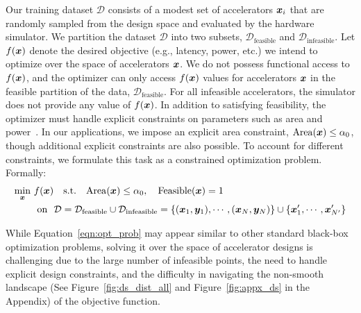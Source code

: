 Our training dataset $\mathcal{D}$ consists of a modest set of accelerators ${\boldsymbol{x}}_i$ that are randomly sampled from the design space and evaluated by the hardware simulator.
%
We partition the dataset $\mathcal{D}$ into two subsets, $\mathcal{D}_\text{feasible}$ and $\mathcal{D}_\text{infeasible}$.
%
Let $f({\boldsymbol{x}})$ denote the desired objective (e.g., latency, power, etc.) we intend to optimize over the space of accelerators ${\boldsymbol{x}}$. We do not possess functional access to $f({\boldsymbol{x}})$, and the optimizer can only access $f({\boldsymbol{x}})$ values for accelerators ${\boldsymbol{x}}$ in the feasible partition of the data, $\mathcal{D}_\text{feasible}$.
%
For all infeasible accelerators, the simulator does not provide any value of $f({\boldsymbol{x}})$.
%
%
In addition to satisfying feasibility, the optimizer must handle explicit constraints on parameters such as area and power~\citep{flynn2011computer}.
%
In our applications, we impose an explicit area constraint, $\mathrm{Area}({\boldsymbol{x}}) \leq \alpha_0$, though additional explicit constraints are also possible. 
%
To account for different constraints, we formulate this task as a constrained optimization problem.
%
Formally:  
\begin{equation}
\label{eqn:opt_prob}
\vspace{-0.2cm}
\begin{aligned}
\min_{\rvx}~ & f(\rvx)
~~~\textrm{s.t.}~~~\mathrm{Area}(\rvx) \leq \review{\alpha_0}, ~~~ \mathrm{Feasible}(\rvx) = 1 \\
\quad &~\text{on}~~ \mathcal{D} = \mathcal{D}_\text{feasible} \cup \mathcal{D}_\text{infeasible} = \{(\rvx_1, \rvy_1), \cdots, (\rvx_N, \rvy_N)\} \cup \{\rvx'_1, \cdots, \rvx'_{N'}\}
\end{aligned}
\end{equation}
%


While Equation~\ref{eqn:opt_prob} may appear similar to other standard black-box optimization problems, solving it over the space of accelerator designs is challenging due to the large number of infeasible points, the need to handle explicit design constraints, and the difficulty in navigating the non-smooth landscape (See Figure~\ref{fig:ds_dist_all} and Figure~\ref{fig:appx_ds} in the Appendix) of the objective function.
%


